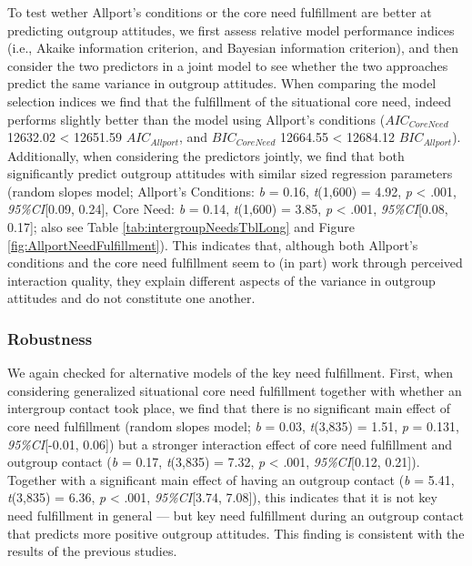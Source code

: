 To test wether Allport's conditions or the core need fulfillment are
better at predicting outgroup attitudes, we first assess relative model
performance indices (i.e., Akaike information criterion, and Bayesian
information criterion), and then consider the two predictors in a joint
model to see whether the two approaches predict the same variance in
outgroup attitudes. When comparing the model selection indices we find
that the fulfillment of the situational core need, indeed performs
slightly better than the model using Allport's conditions
(\(AIC_{CoreNeed}\) 12632.02 \textless{} 12651.59 \(AIC_{Allport}\), and
\(BIC_{CoreNeed}\) 12664.55 \textless{} 12684.12 \(BIC_{Allport}\)).
Additionally, when considering the predictors jointly, we find that both
significantly predict outgroup attitudes with similar sized regression
parameters (random slopes model; Allport's Conditions: \textit{b} =
0.16, \textit{t}(1,600) = 4.92, \textit{p} \textless{} .001,
\textit{95\%CI}{[}0.09, 0.24{]}, Core Need: \textit{b} = 0.14,
\textit{t}(1,600) = 3.85, \textit{p} \textless{} .001,
\textit{95\%CI}{[}0.08, 0.17{]}; also see Table
\ref{tab:intergroupNeedsTblLong} and Figure
\ref{fig:AllportNeedFulfillment}). This indicates that, although both
Allport's conditions and the core need fulfillment seem to (in part)
work through perceived interaction quality, they explain different
aspects of the variance in outgroup attitudes and do not constitute one
another.

\subsubsection{Robustness}

We again checked for alternative models of the key need fulfillment.
First, when considering generalized situational core need fulfillment
together with whether an intergroup contact took place, we find that
there is no significant main effect of core need fulfillment (random
slopes model; \textit{b} = 0.03, \textit{t}(3,835) = 1.51, \textit{p} =
0.131, \textit{95\%CI}{[}-0.01, 0.06{]}) but a stronger interaction
effect of core need fulfillment and outgroup contact (\textit{b} = 0.17,
\textit{t}(3,835) = 7.32, \textit{p} \textless{} .001,
\textit{95\%CI}{[}0.12, 0.21{]}). Together with a significant main
effect of having an outgroup contact (\textit{b} = 5.41,
\textit{t}(3,835) = 6.36, \textit{p} \textless{} .001,
\textit{95\%CI}{[}3.74, 7.08{]}), this indicates that it is not key need
fulfillment in general --- but key need fulfillment during an outgroup
contact that predicts more positive outgroup attitudes. This finding is
consistent with the results of the previous studies.

